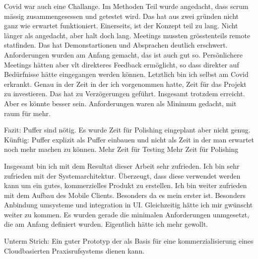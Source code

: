 Covid war auch eine Challange.
Im Methoden Teil wurde angedacht, dass scrum mässig zusammengesessen und getestet wird.
Das hat aus zwei gründen nicht ganz wie erwartet funktioniert.
Einerseits, ist der Konzept teil zu lang.
Nicht länger als angedacht, aber halt doch lang.
Meetings mussten grösstenteils remote statfinden.
Das hat Demonstartionen und Absprachen deutlich erschwert.
Anforderungen wurden am Anfang gemacht, das ist auch gut so.
Persönlichere Meetings hätten aber vlt direkteres Feedback ermöglicht, so dass direkter auf Bedürfnisse hätte eingegangen werden können.
Letztlich bin ich selbst am Covid erkrankt.
Genau in der Zeit in der ich vorgenommen hatte, Zeit für das Projekt zu investieren.
Das hat zu Verzögerungen geführt.
Insgesamt trotzdem erreicht.
Aber es könnte besser sein.
Anforderungen waren als Minimum gedacht, mit raum für mehr.

Fazit: Puffer sind nötig.
Es wurde Zeit für Polishing eingeplant aber nicht genug.
Künftig: Puffer explizit als Puffer einbauen und nicht als Zeit in der man erwartet noch mehr machen zu können.
Mehr Zeit für Testing
Mehr Zeit für Polishing

Insgesamt bin ich mit dem Resultat dieser Arbeit sehr zufrieden.
Ich bin sehr zufrieden mit der Systemarchitektur.
Überzeugt, dass diese verwendet werden kann um ein gutes, kommerzielles Produkt zu erstellen.
Ich bin weiter zufrieden mit dem Aufbau des Mobile Clients.
Besonders da es mein erster ist.
Besonders Anbindung umsysteme und integration in UI.
Gleichzeitig hätte ich mir gwünscht weiter zu kommen.
Es wurden gerade die minimalen Anforderungen unmgesetzt, die am Anfang definiert wurden.
Eigentlich hätte ich mehr gewollt.

Unterm Strich: Ein guter Prototyp der als Basis für eine kommerzialisierung eines Cloudbasierten Praxisrufsystems dienen kann.
